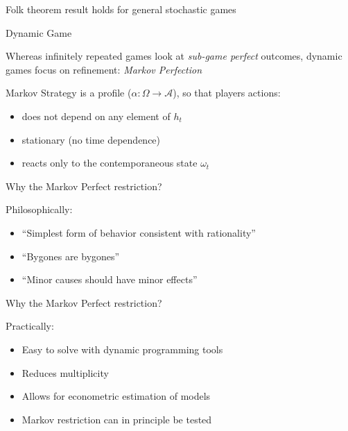 \documentclass{beamer}
\begin{document}
\begin{frame}
\begin{card}
Folk theorem result holds for general stochastic games
\end{card}
\end{frame}

\begin{frame}{Dynamic Game}
\begin{card}
Whereas infinitely repeated games look at \emph{\color{primary}sub-game perfect} outcomes, dynamic games focus on refinement: \emph{\color{primary}Markov Perfection}
\end{card}

\begin{card}
Markov Strategy is a profile ($\alpha:\Omega\rightarrow\mathcal{A}$), so that players actions:
    \begin{itemize}
    \item does not depend on any element of $h_{t}$
    \item stationary (no time dependence)
    \item reacts only to the contemporaneous state $\omega_{t}$
    \end{itemize}
\end{card}

\end{frame}


\begin{frame}{Why the Markov Perfect restriction?}
\begin{card}
 Philosophically:
    \begin{itemize}
    \item ``Simplest form of behavior consistent with rationality''
    \item ``Bygones are bygones''
    \item ``Minor causes should have minor effects''
    \end{itemize}
\end{card}

\end{frame} 
\begin{frame}{Why the Markov Perfect restriction?}
\begin{card}
Practically:
\begin{itemize}
\item Easy to solve with dynamic programming tools
\item Reduces multiplicity
\item Allows for econometric estimation of models
\item Markov restriction can in principle be tested
\end{itemize}
\end{card}
\end{frame} 
\end{document}
